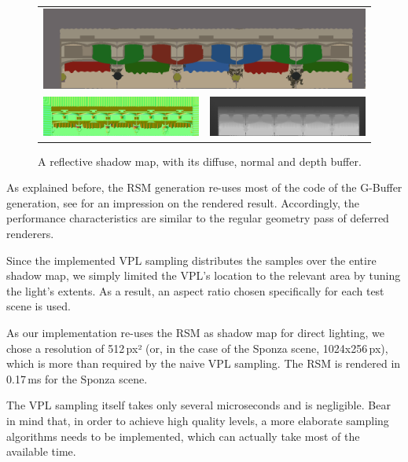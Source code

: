 \begin{figure}[htb]
\centering
  \begin{tabular}{@{}cc@{}}
    \multicolumn{2}{c}{\includegraphics[width=1.0\textwidth]{screenshots/RSM_diffuse}} \\
    \includegraphics[width=.48\textwidth]{screenshots/RSM_normal} &
    \includegraphics[width=.48\textwidth]{screenshots/RSM_depth}
  \end{tabular}
  \caption{A reflective shadow map, with its diffuse, normal and depth buffer.}
  \label{fig:results:RSMBuffers}
\end{figure}


As explained before, the RSM generation re-uses most of the code of the G-Buffer generation, see  for an impression on the rendered result. Accordingly, the performance characteristics are similar to the regular geometry pass of deferred renderers.

Since the implemented VPL sampling distributes the samples over the entire shadow map, we simply limited the VPL's location to the relevant area by tuning the light's extents. As a result, an aspect ratio chosen specifically for each test scene is used.

As our implementation re-uses the RSM as shadow map for direct lighting, we chose a resolution of 512\,px² (or, in the case of the Sponza scene, 1024x256\,px), which is more than required by the naive VPL sampling. The RSM is rendered in 0.17\,ms for the Sponza scene.

The VPL sampling itself takes only several microseconds and is negligible. Bear in mind that, in order to achieve high quality levels, a more elaborate sampling algorithms needs to be implemented, which can actually take most of the available time.

